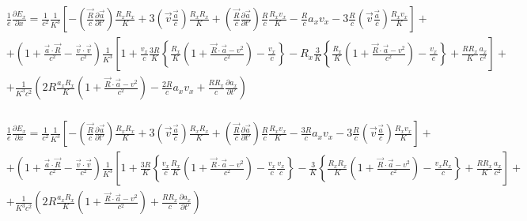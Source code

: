 \documentclass[11pt]{article}
\begin{document}
\[\begin{align}
  & \frac{1}{e}\frac{\partial {{E}_{x}}}{\partial x}=\frac{1}{{{c}^{2}}}\frac{1}{{{K}^{3}}}\left[ -\left( \frac{\overrightarrow{R}}{c}\frac{\partial \overrightarrow{a}}{\partial t'} \right)\frac{{{R}_{x}}{{R}_{x}}}{K}+3\left( \overrightarrow{v}\frac{\overrightarrow{a}}{c} \right)\frac{{{R}_{x}}{{R}_{x}}}{K}+\left( \frac{\overrightarrow{R}}{c}\frac{\partial \overrightarrow{a}}{\partial t'} \right)\frac{R}{c}\frac{{{R}_{x}}{{v}_{x}}}{K}-\frac{R}{c}{{a}_{x}}{{v}_{x}}-3\frac{R}{c}\left( \overrightarrow{v}\frac{\overrightarrow{a}}{c} \right)\frac{{{R}_{x}}{{v}_{x}}}{K} \right]+ \\ 
 & +\left( 1+\frac{\overrightarrow{a}\cdot \overrightarrow{R}}{{{c}^{2}}}-\frac{\overrightarrow{v}\cdot \overrightarrow{v}}{{{c}^{2}}} \right)\frac{1}{{{K}^{3}}}\left[ 1+\frac{{{v}_{x}}}{c}\frac{3R}{K}\left\{ \frac{{{R}_{x}}}{K}\left( 1+\frac{\overrightarrow{R}\cdot \overrightarrow{a}-{{v}^{2}}}{{{c}^{2}}} \right)-\frac{{{v}_{x}}}{c} \right\}-{{R}_{x}}\frac{3}{K}\left\{ \frac{{{R}_{x}}}{K}\left( 1+\frac{\overrightarrow{R}\cdot \overrightarrow{a}-{{v}^{2}}}{{{c}^{2}}} \right)-\frac{{{v}_{x}}}{c} \right\}+\frac{R{{R}_{x}}}{K}\frac{{{a}_{x}}}{{{c}^{2}}} \right]+ \\ 
 & +\frac{1}{{{K}^{3}}{{c}^{2}}}\left( 2R\frac{{{a}_{x}}{{R}_{x}}}{K}\left( 1+\frac{\overrightarrow{R}\cdot \overrightarrow{a}-{{v}^{2}}}{{{c}^{2}}} \right)-\frac{2R}{c}{{a}_{x}}{{v}_{x}}+\frac{R{{R}_{x}}}{c}\frac{\partial {{a}_{x}}}{\partial t'} \right) \\ 
\end{align}\]

\[\begin{align}
  & \frac{1}{e}\frac{\partial {{E}_{x}}}{\partial x}=\frac{1}{{{c}^{2}}}\frac{1}{{{K}^{3}}}\left[ -\left( \frac{\overrightarrow{R}}{c}\frac{\partial \overrightarrow{a}}{\partial t'} \right)\frac{{{R}_{x}}{{R}_{x}}}{K}+3\left( \overrightarrow{v}\frac{\overrightarrow{a}}{c} \right)\frac{{{R}_{x}}{{R}_{x}}}{K}+\left( \frac{\overrightarrow{R}}{c}\frac{\partial \overrightarrow{a}}{\partial t'} \right)\frac{R}{c}\frac{{{R}_{x}}{{v}_{x}}}{K}-\frac{3R}{c}{{a}_{x}}{{v}_{x}}-3\frac{R}{c}\left( \overrightarrow{v}\frac{\overrightarrow{a}}{c} \right)\frac{{{R}_{x}}{{v}_{x}}}{K} \right]+ \\ 
 & +\left( 1+\frac{\overrightarrow{a}\cdot \overrightarrow{R}}{{{c}^{2}}}-\frac{\overrightarrow{v}\cdot \overrightarrow{v}}{{{c}^{2}}} \right)\frac{1}{{{K}^{3}}}\left[ 1+\frac{3R}{K}\left\{ \frac{{{v}_{x}}}{c}\frac{{{R}_{x}}}{K}\left( 1+\frac{\overrightarrow{R}\cdot \overrightarrow{a}-{{v}^{2}}}{{{c}^{2}}} \right)-\frac{{{v}_{x}}}{c}\frac{{{v}_{x}}}{c} \right\}-\frac{3}{K}\left\{ \frac{{{R}_{x}}{{R}_{x}}}{K}\left( 1+\frac{\overrightarrow{R}\cdot \overrightarrow{a}-{{v}^{2}}}{{{c}^{2}}} \right)-\frac{{{v}_{x}}{{R}_{x}}}{c} \right\}+\frac{R{{R}_{x}}}{K}\frac{{{a}_{x}}}{{{c}^{2}}} \right]+ \\ 
 & +\frac{1}{{{K}^{3}}{{c}^{2}}}\left( 2R\frac{{{a}_{x}}{{R}_{x}}}{K}\left( 1+\frac{\overrightarrow{R}\cdot \overrightarrow{a}-{{v}^{2}}}{{{c}^{2}}} \right)+\frac{R{{R}_{x}}}{c}\frac{\partial {{a}_{x}}}{\partial t'} \right) \\ 
\end{align}\]
\end{document}
